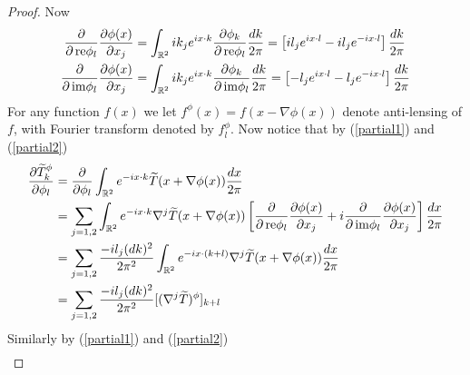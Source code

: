 \documentclass[noinfoline]{imsart}
\newcommand{\re}{\text{\,\rm re}}
\newcommand{\im}{\text{\,\rm im}}
\begin{document}
\begin{proof}
Now
\begin{align}
\label{partial1}
\frac{\partial}{\partial \re \phi_{ l}}\frac{\partial\phi(x)}{ \partial x_j}  &= \int_{\Bbb R^2} i  k_j e^{ix \cdot  k} \frac{\partial \phi_ k}{\partial \re \phi_{l} }  \frac{d k}{2\pi} 
=\left[i  l_j e^{ix \cdot  l}  - i  l_j e^{-i x \cdot  l}  \right] \frac{d k}{2\pi}   \\
\label{partial2}\frac{\partial}{\partial \im \phi_{ l}}\frac{\partial\phi(x)}{ \partial x_j}  &= \int_{\Bbb R^2} i  k_j e^{ix \cdot  k} \frac{\partial \phi_ k}{\partial \im \phi_{l} }  \frac{d k}{2\pi} 
=\left[-  l_j e^{ix \cdot  l}  -  l_j e^{-i x \cdot  l}  \right] \frac{d k}{2\pi}   
\end{align}
For any function $f(x)$ we let $f^\phi(x) = f(x-\nabla \phi(x))$ denote anti-lensing of $f$, with Fourier transform denoted by $f_l^\phi$. 
Now notice that by (\ref{partial1}) and (\ref{partial2})
\begin{align}
\nonumber \frac{\partial \widetilde T^\phi_k}{\partial \phi_{ l} } 
&=  \frac{\partial}{\partial  \phi_{ l} } \int_{\Bbb R^2}  e^{-ix \cdot k}\widetilde T(x+\nabla \phi(x))\frac{dx}{2\pi} \\
\nonumber &= \sum_{j=1,2}  \int_{\Bbb R^2} e^{-ix \cdot k} \nabla^j\widetilde T(x+\nabla \phi(x))\left[ \frac{\partial}{\partial \re \phi_{ l}}\frac{\partial\phi(x)}{ \partial x_j} +i  \frac{\partial}{\partial \im \phi_{ l}}\frac{\partial\phi(x)}{ \partial x_j}\right]\frac{dx}{2\pi}\\
\nonumber &= \sum_{j=1,2}\frac{ - il_j  (dk)^2}{2\pi^2}  \int_{\Bbb R^2} e^{- ix \cdot (k+l)} \nabla^j\widetilde T(x+\nabla \phi(x))\frac{dx}{2\pi} \\
&=\sum_{j=1,2}\frac{ - il_j  (dk)^2}{2\pi^2} [(\nabla^j\widetilde T)^\phi]_{k+l}
\end{align}
Similarly by (\ref{partial1}) and (\ref{partial2})
\begin{align}

\end{align}
\end{proof}
\end{document}
